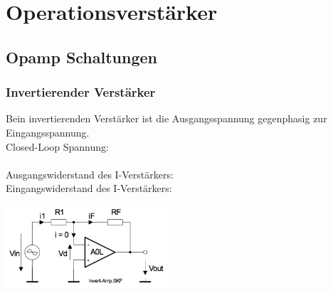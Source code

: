 \section{Operationsverstärker }
		\subsection{Opamp Schaltungen}
		\subsubsection{Invertierender Verstärker }
			\begin{minipage}[T]{12cm}
          	  Bein invertierenden Verstärker ist die Ausgangsspannung gegenphasig
            	zur Eingangsspannung.\\
            	Closed-Loop Spannung:
            	\hspace{23mm}\\
            	\hspace*{10mm}
           		\hspace{29.5mm}\\
            	Ausgangswiderstand des I-Verstärkers: \\
            	Eingangswiderstand des I-Verstärkers:
            	\hspace{0.5mm}
            \end{minipage}
			\begin{minipage}{6cm}
            	\includegraphics[width=6cm]{./bilder/i-verstaerker.png}
            \end{minipage}\\

